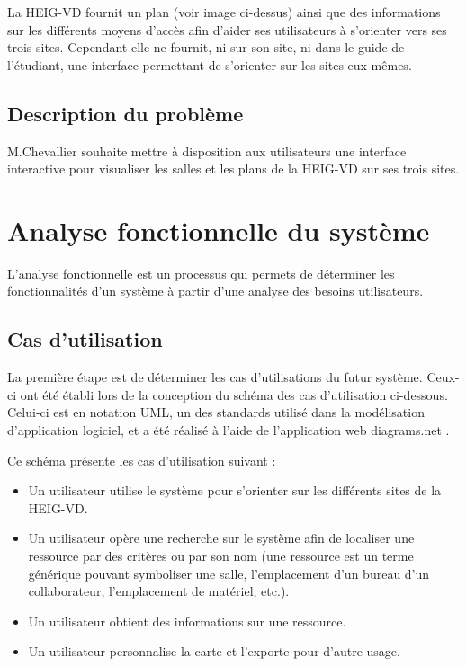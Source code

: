 \documentclass[
    iai, %
    il, %
]{heig-tb}
\begin{document}
La HEIG-VD fournit un plan \cite{plan-heig} (voir image ci-dessus) ainsi que des informations sur les différents moyens d'accès afin d'aider ses utilisateurs à s'orienter vers ses trois sites.
Cependant elle ne fournit, ni sur son site, ni dans le guide de l'étudiant, une interface permettant de s'orienter sur les sites eux-mêmes.

\section{Description du problème}
M.Chevallier souhaite mettre à disposition aux utilisateurs une interface interactive pour visualiser les salles et les plans de la HEIG-VD sur ses trois sites.

\chapter{Analyse fonctionnelle du système}
L'analyse fonctionnelle est un processus qui permets de déterminer les fonctionnalités d'un système à partir d'une analyse des besoins utilisateurs.

\section{Cas d'utilisation}
La première étape est de déterminer les cas d'utilisations du futur système.
Ceux-ci ont été établi lors de la conception du schéma des cas d'utilisation ci-dessous.
Celui-ci est en notation UML, un des standards utilisé dans la modélisation d'application logiciel, et a été réalisé à l'aide de l'application web diagrams.net \cite{diagrams}.


\newpage
Ce schéma présente les cas d'utilisation suivant :
\begin{itemize}
    \item Un utilisateur utilise le système pour s'orienter sur les différents sites de la HEIG-VD.
    \item Un utilisateur opère une recherche sur le système afin de localiser une ressource par des critères ou par son nom (une ressource est un terme générique pouvant symboliser une salle, l'emplacement d'un bureau d'un collaborateur, l'emplacement de matériel, etc.).
    \item Un utilisateur obtient des informations sur une ressource.
    \item Un utilisateur personnalise la carte et l'exporte pour d'autre usage.
\end{itemize}
\end{document}
